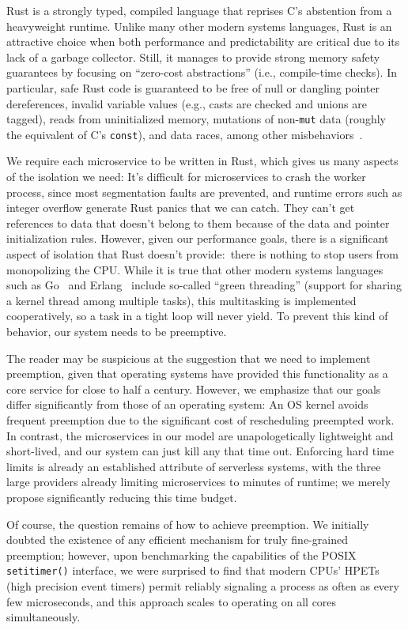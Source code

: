 Rust is a strongly typed, compiled language that reprises C's abstention from a
heavyweight runtime.  Unlike many other modern systems languages, Rust is an
attractive choice when both performance and predictability are critical due to its
lack of a garbage collector.  Still, it manages to provide strong memory safety
guarantees by focusing on ``zero-cost abstractions'' (i.e., compile-time checks).  In
particular, safe Rust code is guaranteed to be free of null or dangling pointer
dereferences, invalid variable values (e.g., casts are checked and unions are
tagged), reads from uninitialized memory, mutations of non-\texttt{mut} data (roughly
the equivalent of C's \texttt{const}), and data races, among other
misbehaviors~\cite{www-rustlang-ub}.

We require each microservice to be written in Rust, which gives us many aspects of
the isolation we need:  It's difficult for microservices to crash the worker process,
since most segmentation faults are prevented, and runtime errors such as integer
overflow generate Rust panics that we can catch.  They can't get references to data
that doesn't belong to them because of the data and pointer initialization rules.
However, given our performance goals, there is a significant aspect of isolation that
Rust doesn't provide:\ there is nothing to stop users from monopolizing the CPU.
While it is true that other modern systems languages such as Go~\cite{www-golang} and
Erlang~\cite{www-erlang} include so-called ``green threading'' (support for sharing a
kernel thread among multiple tasks), this multitasking is implemented cooperatively,
so a task in a tight loop will never yield.  To prevent this kind of behavior, our
system needs to be preemptive.

The reader may be suspicious at the suggestion that we need to implement preemption,
given that operating systems have provided this functionality as a core service for
close to half a century.  However, we emphasize that our goals differ significantly
from those of an operating system:  An OS kernel avoids frequent preemption due to
the significant cost of rescheduling preempted work.  In contrast, the microservices
in our model are unapologetically lightweight and short-lived, and our system can
just kill any that time out.  Enforcing hard time limits is already an established
attribute of serverless systems, with the three large providers already limiting
microservices to minutes of runtime; we merely propose significantly reducing this
time budget.

Of course, the question remains of how to achieve preemption.  We initially doubted
the existence of any efficient mechanism for truly fine-grained preemption; however,
upon benchmarking the capabilities of the POSIX \texttt{setitimer()} interface, we
were surprised to find that modern CPUs' HPETs (high precision event timers) permit
reliably signaling a process as often as every few microseconds, and this approach
scales to operating on all cores simultaneously.
